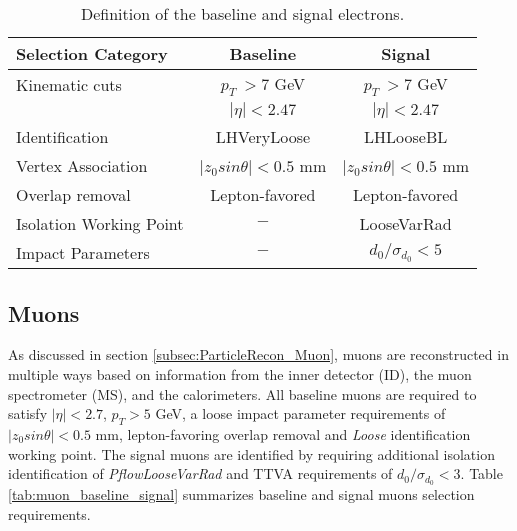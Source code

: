 \begin{table}[ht]
	\centering
		\caption{Definition of the baseline and signal electrons.\label{tab:Electron_RecoSel}}
		\begin{tabular}{|| l || c | c ||}
		\hline
		Selection Category & \textbf{Baseline} & \textbf{Signal} \\
		\hline\hline
		Kinematic cuts & $p_{T}~ > 7$ GeV & $ p_{T}~ > 7$ GeV \\
		            & $|\eta| < 2.47$  &  $|\eta| < 2.47$\\
		\hline  
		Identification & LHVeryLoose & LHLooseBL \\
		\hline 
		Vertex Association & $|z_{0}sin\theta| < 0.5$ mm & $|z_{0}sin\theta|< 0.5$ mm\\
		\hline
		Overlap removal & Lepton-favored & Lepton-favored\\
		\hline
		Isolation Working Point & $-$ & LooseVarRad\\
		\hline 
		Impact Parameters & $-$ & $d_{0}/ \sigma_{d_{0}} < 5$ \\
		\hline
	\end{tabular}
\end{table}

\subsection{Muons}
\label{subsec:MuonRecon}
As discussed in section \ref{subsec:ParticleRecon_Muon}, muons are reconstructed in multiple ways based on information from the inner detector (ID), the muon spectrometer (MS), and the calorimeters. All baseline muons are required to satisfy $ |\eta| < 2.7 $, $p_{T} > 5$ GeV, a loose impact parameter requirements of $|z_{0}sin\theta| < 0.5 $ mm, lepton-favoring overlap removal and \textit{Loose} identification working point. The signal muons are identified by requiring additional isolation identification of \textit{PflowLooseVarRad} and TTVA requirements of $d_{0}/\sigma_{d_{0}} < 3$. Table \ref{tab:muon_baseline_signal} summarizes baseline and signal muons selection requirements.

